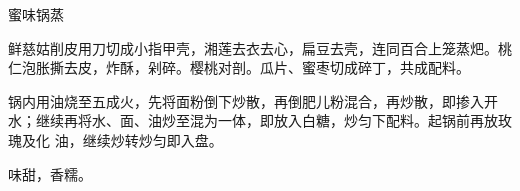 %
%
%
%
%
%
%
\begin{recipe}[八宝锅蒸]{蜜味锅蒸}

\ingredients


\preparation

\step 鲜慈姑削皮用刀切成小指甲壳，湘莲去衣去心，扁豆去壳，连同百合上笼蒸𤆵。桃
仁泡胀撕去皮，炸酥，剁碎。樱桃对剖。瓜片、蜜枣切成碎丁，共成配料。

\step 锅内用油烧至五成火，先将面粉倒下炒散，再倒肥儿粉混合，再炒散，即掺入开
水；继续再将水、面、油炒至混为一体，即放入白糖，炒匀下配料。起锅前再放玫瑰及化
油，继续炒转炒匀即入盘。

\features

味甜，香糯。

\end{recipe}

